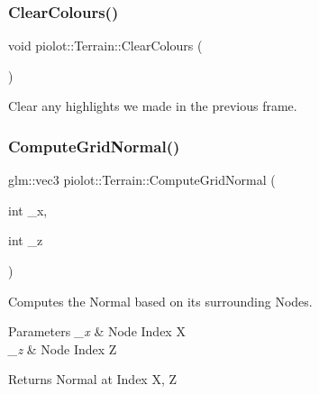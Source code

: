 \mbox{\label{classpiolot_1_1_terrain_afe488b112444dc406a12fe83f8fb1a90}} 
\subsubsection{\texorpdfstring{Clear\+Colours()}{ClearColours()}}
{\footnotesize\ttfamily void piolot\+::\+Terrain\+::\+Clear\+Colours (\begin{DoxyParamCaption}{ }\end{DoxyParamCaption})}



Clear any highlights we made in the previous frame. 

\mbox{\label{classpiolot_1_1_terrain_a8228070fe11ba581ee8a8b8f9fe303d4}} 
\subsubsection{\texorpdfstring{Compute\+Grid\+Normal()}{ComputeGridNormal()}}
{\footnotesize\ttfamily glm\+::vec3 piolot\+::\+Terrain\+::\+Compute\+Grid\+Normal (\begin{DoxyParamCaption}\item[{int}]{\+\_\+x,  }\item[{int}]{\+\_\+z }\end{DoxyParamCaption})\hspace{0.3cm}{\ttfamily [private]}}



Computes the Normal based on its surrounding Nodes. 


\begin{DoxyParams}{Parameters}
{\em \+\_\+x} & Node Index X \\
\hline
{\em \+\_\+z} & Node Index Z \\
\hline
\end{DoxyParams}
\begin{DoxyReturn}{Returns}
Normal at Index X, Z 
\end{DoxyReturn}
\mbox{\label{classpiolot_1_1_terrain_af2bc3eb0ea909a0fd96b6c11aeb29c8a}} 
